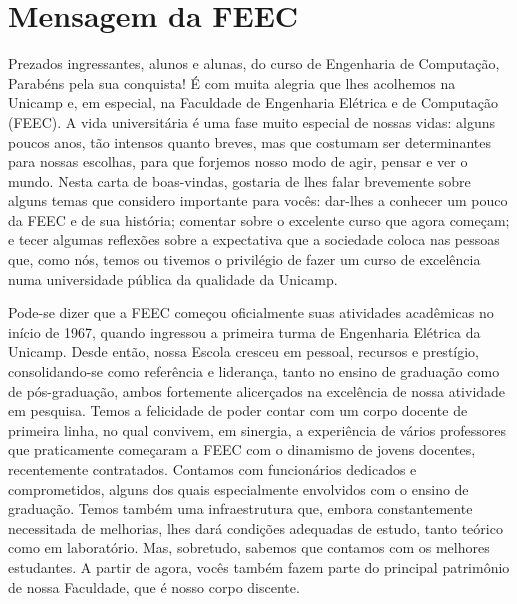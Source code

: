 \section{Mensagem da FEEC}

Prezados ingressantes, alunos e alunas, do curso de Engenharia de Computação,\\

Parabéns pela sua conquista! É com muita alegria que lhes acolhemos na Unicamp
e, em especial, na Faculdade de Engenharia Elétrica e de Computação (FEEC). A
vida universitária é uma fase muito especial de nossas vidas: alguns poucos
anos, tão intensos quanto breves, mas que costumam ser determinantes para
nossas escolhas, para que forjemos nosso modo de agir, pensar e ver o mundo.
Nesta carta de boas-vindas, gostaria de lhes falar brevemente sobre alguns
temas que considero importante para vocês: dar-lhes a conhecer um pouco da FEEC
e de sua história; comentar sobre o excelente curso que agora começam; e tecer
algumas reflexões sobre a expectativa que a sociedade coloca nas pessoas que,
como nós, temos ou tivemos o privilégio de fazer um curso de excelência numa
universidade pública da qualidade da Unicamp.

Pode-se dizer que a FEEC começou oficialmente suas atividades acadêmicas no
início de 1967, quando ingressou a primeira turma de Engenharia Elétrica da
Unicamp. Desde então, nossa Escola cresceu em pessoal, recursos e prestígio,
consolidando-se como referência e liderança, tanto no ensino de graduação como
de pós-graduação, ambos fortemente alicerçados na excelência de nossa atividade
em pesquisa. Temos a felicidade de poder contar com um corpo docente de
primeira linha, no qual convivem, em sinergia, a experiência de vários
professores que praticamente começaram a FEEC com o dinamismo de jovens
docentes, recentemente contratados. Contamos com funcionários dedicados e
comprometidos, alguns dos quais especialmente envolvidos com o ensino de
graduação. Temos também uma infraestrutura que, embora constantemente
necessitada de melhorias, lhes dará condições adequadas de estudo, tanto
teórico como em laboratório. Mas, sobretudo, sabemos que contamos com os
melhores estudantes. A partir de agora, vocês também fazem parte do principal
patrimônio de nossa Faculdade, que é nosso corpo discente.


